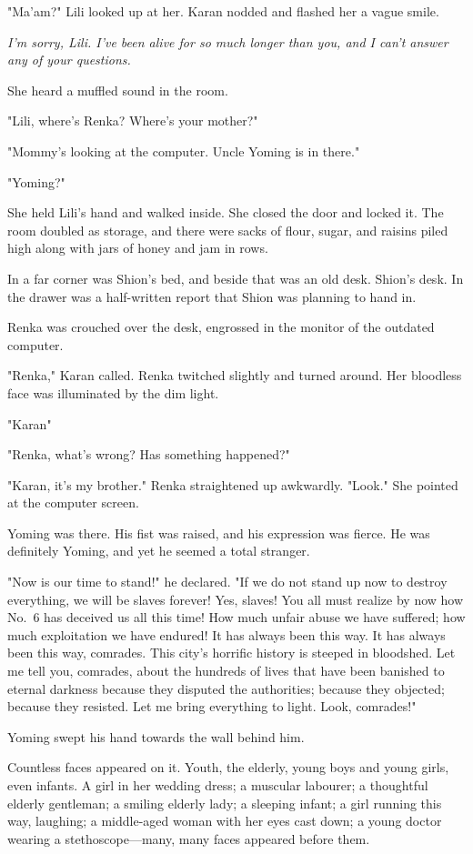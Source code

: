 "Ma'am?" Lili looked up at her. Karan nodded and flashed her a vague
smile.

\emph{I'm sorry, Lili. I've been alive for so much longer than you, and I
can't answer any of your questions.}

She heard a muffled sound in the room.

"Lili, where's Renka? Where's your mother?"

"Mommy's looking at the computer. Uncle Yoming is in there."

"Yoming?"

She held Lili's hand and walked inside. She closed the door and locked
it. The room doubled as storage, and there were sacks of flour, sugar,
and raisins piled high along with jars of honey and jam in rows.

In a far corner was Shion's bed, and beside that was an old desk.
Shion's desk. In the drawer was a half-written report that Shion was
planning to hand in.

Renka was crouched over the desk, engrossed in the monitor of the
outdated computer.

"Renka," Karan called. Renka twitched slightly and turned around. Her
bloodless face was illuminated by the dim light.

"Karan\el "

"Renka, what's wrong? Has something happened?"

"Karan, it's my brother." Renka straightened up awkwardly. "Look." She
pointed at the computer screen.

Yoming was there. His fist was raised, and his expression was fierce. He
was definitely Yoming, and yet he seemed a total stranger.

"Now is our time to stand!" he declared. "If we do not stand up now to
destroy everything, we will be slaves forever! Yes, slaves! You all must
realize by now how No.~6 has deceived us all this time! How much unfair
abuse we have suffered; how much exploitation we have endured! It has
always been this way. It has always been this way, comrades. This city's
horrific history is steeped in bloodshed. Let me tell you, comrades,
about the hundreds of lives that have been banished to eternal darkness
because they disputed the authorities; because they objected; because
they resisted. Let me bring everything to light. Look, comrades!"

Yoming swept his hand towards the wall behind him.

Countless faces appeared on it. Youth, the elderly, young boys and young
girls, even infants. A girl in her wedding dress; a muscular labourer; a
thoughtful elderly gentleman; a smiling elderly lady; a sleeping infant;
a girl running this way, laughing; a middle-aged woman with her eyes
cast down; a young doctor wearing a stethoscope---many, many faces
appeared before them.

